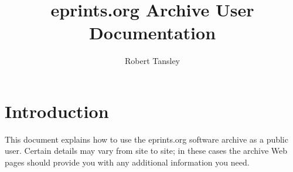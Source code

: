 \documentclass[a4paper]{article}
\title{eprints.org Archive User Documentation}
\author{Robert Tansley}
\begin{document}
\maketitle

\section{Introduction}

This document explains how to use the eprints.org software archive as a public user. Certain details may vary from site to site; in these cases the archive Web pages should provide you with any additional information you need.






\end{document}
